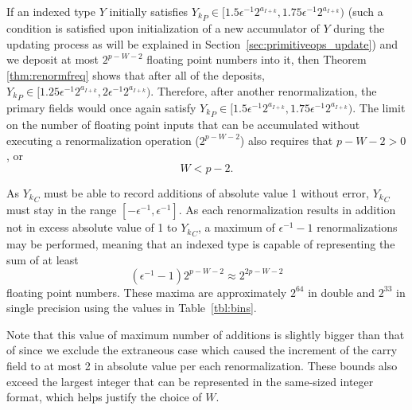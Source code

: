     If an indexed type $Y$ initially satisfies ${Y_k}_P \in [1.5  \epsilon^{-1}
    2^{a_{I + k}}, 1.75  \epsilon^{-1} 2^{a_{I + k}})$
    (such a condition is satisfied upon initialization of a new accumulator of $Y$
    during the updating process as will be explained in Section~\ref{sec:primitiveops_update})
    and we deposit at most
    $2^{p-W-2}$ floating point numbers into it, then Theorem \ref{thm:renormfreq}
    shows that after all of the deposits, ${Y_k}_P \in [1.25  \epsilon^{-1}
    2^{a_{I + k}}, 2  \epsilon^{-1} 2^{a_{I + k}})$. Therefore, after another
    renormalization, the primary fields would once again satisfy ${Y_k}_P \in
    [1.5  \epsilon^{-1} 2^{a_{I + k}}, 1.75  \epsilon^{-1} 2^{a_{I + k}})$.
    The limit on the number of floating point inputs that can be accumulated
    without executing a renormalization operation ($2^{p-W-2}$)
    also requires that $p-W-2 > 0$, or
    \begin{equation}
        W < p - 2.
    \end{equation}

    As ${Y_k}_C$ must be able to record additions of absolute value 1 without
    error, ${Y_k}_C$ must stay in the range $[-\epsilon^{-1}, \epsilon^{-1}]$.
    As each renormalization results in addition not in excess absolute value of
    1 to ${Y_k}_C$, a maximum of $\epsilon^{-1} - 1$ renormalizations may be
    performed, meaning that an indexed type is capable of representing the sum
    of at least
    \begin{equation}
      (\epsilon^{-1} - 1) 2^{p-W-2} \approx 2^{2  p - W - 2}
      \label{eq:totalfreq}
    \end{equation}
    floating point numbers. These maxima are approximately $2^{64}$ in double and $2^{33}$ in single
    precision using the values in Table~\ref{tbl:bins}.

    Note that this value of maximum number of additions is slightly bigger
    than that of \cite{repsum} since we exclude the extraneous case which caused
    the increment of the carry field to at most 2 in absolute value per each renormalization.
    These bounds also exceed the largest integer that can be represented
    in the same-sized integer format, which helps justify the choice of $W$.
